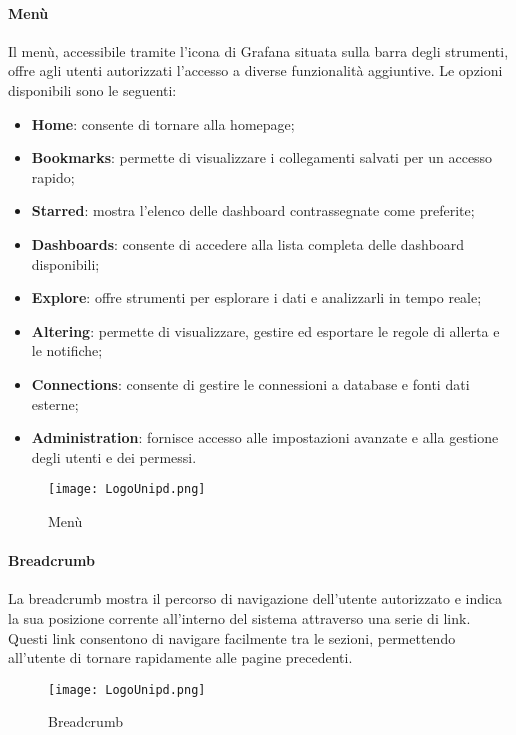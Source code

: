\documentclass[10pt]{article}
\begin{document}
\begin{justify}
    \paragraph{Menù}
    Il menù, accessibile tramite l'icona di Grafana situata sulla barra degli strumenti, offre agli utenti autorizzati l'accesso a diverse funzionalità aggiuntive. Le opzioni disponibili sono le seguenti:
    \begin{itemize}
        \item \textbf{Home}: consente di tornare alla homepage;
        \item \textbf{Bookmarks}: permette di visualizzare i collegamenti salvati per un accesso rapido;
        \item \textbf{Starred}: mostra l'elenco delle dashboard contrassegnate come preferite;
        \item \textbf{Dashboards}: consente di accedere alla lista completa delle dashboard disponibili;
        \item \textbf{Explore}: offre strumenti per esplorare i dati e analizzarli in tempo reale;
        \item \textbf{Altering}: permette di visualizzare, gestire ed esportare le regole di allerta e le notifiche;
        \item \textbf{Connections}: consente di gestire le connessioni a database e fonti dati esterne;
        \item \textbf{Administration}: fornisce accesso alle impostazioni avanzate e alla gestione degli utenti e dei permessi.
    \end{itemize}
    \begin{figure}[H]
    \centering
    \texttt{[image: LogoUnipd.png]}
    \caption{Menù}
    \end{figure}

    \paragraph{Breadcrumb}
    La breadcrumb mostra il percorso di navigazione dell'utente autorizzato e indica la sua posizione corrente all'interno del sistema attraverso una serie di link. Questi link consentono di navigare facilmente tra le sezioni, permettendo all'utente di tornare rapidamente alle pagine precedenti.
    \begin{figure}[H]
    \centering
    \texttt{[image: LogoUnipd.png]}
    \caption{Breadcrumb}
    \end{figure}


\end{justify}
\end{document}
